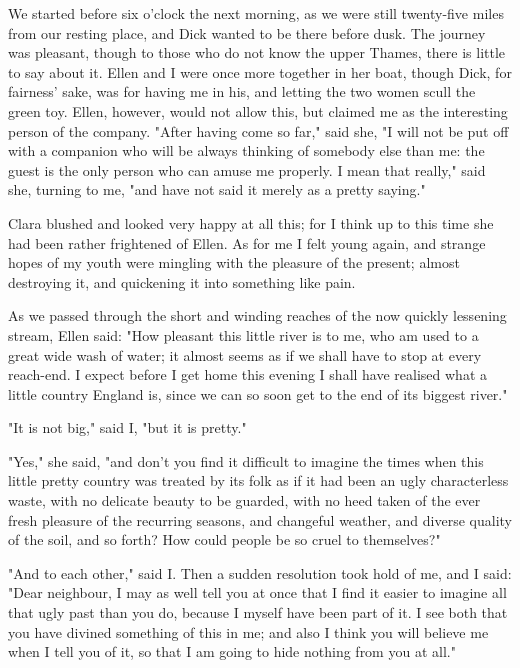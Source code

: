 We started before six o'clock the next morning, as we were still
twenty-five miles from our resting place, and Dick wanted to be there
before dusk. The journey was pleasant, though to those who do not know
the upper Thames, there is little to say about it. Ellen and I were once
more together in her boat, though Dick, for fairness' sake, was for
having me in his, and letting the two women scull the green toy. Ellen,
however, would not allow this, but claimed me as the interesting person
of the company. "After having come so far," said she, "I will not be put
off with a companion who will be always thinking of somebody else than
me: the guest is the only person who can amuse me properly. I mean that
really," said she, turning to me, "and have not said it merely as a
pretty saying."

Clara blushed and looked very happy at all this; for I think up to this
time she had been rather frightened of Ellen. As for me I felt young
again, and strange hopes of my youth were mingling with the pleasure of
the present; almost destroying it, and quickening it into something like
pain.

As we passed through the short and winding reaches of the now quickly
lessening stream, Ellen said: "How pleasant this little river is to me,
who am used to a great wide wash of water; it almost seems as if we
shall have to stop at every reach-end. I expect before I get home this
evening I shall have realised what a little country England is, since we
can so soon get to the end of its biggest river."

"It is not big," said I, "but it is pretty."

"Yes," she said, "and don't you find it difficult to imagine the times
when this little pretty country was treated by its folk as if it had
been an ugly characterless waste, with no delicate beauty to be guarded,
with no heed taken of the ever fresh pleasure of the recurring seasons,
and changeful weather, and diverse quality of the soil, and so forth?
How could people be so cruel to themselves?"

"And to each other," said I. Then a sudden resolution took hold of me,
and I said: "Dear neighbour, I may as well tell you at once that I find
it easier to imagine all that ugly past than you do, because I myself
have been part of it. I see both that you have divined something of this
in me; and also I think you will believe me when I tell you of it, so
that I am going to hide nothing from you at all."

